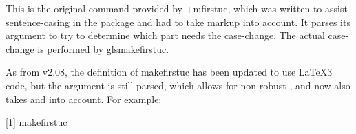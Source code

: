 \documentclass[titlepage=false,oneside,
 fontsize=12pt,captions=tableheading]{scrbook}
\begin{document}
This is the original command provided by \sty+{mfirstuc}, which was
written to assist sentence-casing in the  package
and had to take markup into account. It parses its argument to try
to determine which part needs the case-change. The actual
case-change is performed by \gls{glsmakefirstuc}.

As from v2.08, the definition of \gls{makefirstuc} has been updated to use \LaTeX3
code, but the argument is still parsed, which allows for non-robust 
, and now also takes  and  into
account. For example:
\begin{codebox}
[1]
\gls{makefirstuc}
\end{codebox}
\begin{resultbox}
\newcommand{\alert}[1]{\textcolor{red}{\textbf{#1}}}
\makefirstuc{\alert{sample} text}
\end{resultbox}
\end{document}
